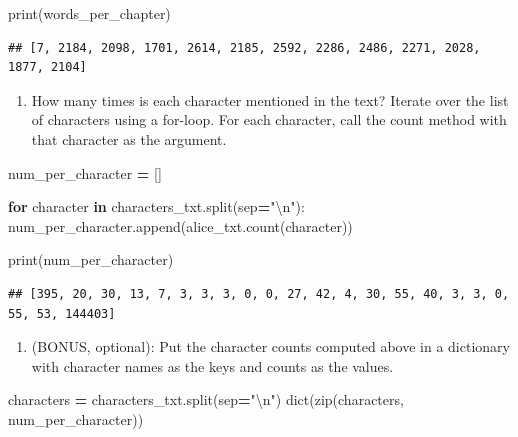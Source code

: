 \documentclass[
]{book}
\newenvironment{Shaded}{\begin{snugshade}}{\end{snugshade}}
\newcommand{\BuiltInTok}[1]{#1}
\newcommand{\CharTok}[1]{\textcolor[rgb]{0.31,0.60,0.02}{#1}}
\newcommand{\ControlFlowTok}[1]{\textcolor[rgb]{0.13,0.29,0.53}{\textbf{#1}}}
\newcommand{\KeywordTok}[1]{\textcolor[rgb]{0.13,0.29,0.53}{\textbf{#1}}}
\newcommand{\NormalTok}[1]{#1}
\newcommand{\OperatorTok}[1]{\textcolor[rgb]{0.81,0.36,0.00}{\textbf{#1}}}
\newcommand{\StringTok}[1]{\textcolor[rgb]{0.31,0.60,0.02}{#1}}
\providecommand{\tightlist}{%
  \setlength{\itemsep}{0pt}\setlength{\parskip}{0pt}}
\begin{document}
\begin{alert}
\begin{Shaded}
\begin{Highlighting}[]
\BuiltInTok{print}\NormalTok{(words\_per\_chapter)}
\end{Highlighting}
\end{Shaded}

\begin{verbatim}
## [7, 2184, 2098, 1701, 2614, 2185, 2592, 2286, 2486, 2271, 2028, 1877, 2104]
\end{verbatim}

\begin{enumerate}
\def\labelenumi{\arabic{enumi}.}
\setcounter{enumi}{2}
\tightlist
\item
  How many times is each character mentioned in the text?
  Iterate over the list of characters using a for-loop.
  For each character, call the count method with that character as the argument.
\end{enumerate}

\begin{Shaded}
\begin{Highlighting}[]
\NormalTok{num\_per\_character }\OperatorTok{=}\NormalTok{ []}

\ControlFlowTok{for}\NormalTok{ character }\KeywordTok{in}\NormalTok{ characters\_txt.split(sep}\OperatorTok{=}\StringTok{"}\CharTok{\textbackslash{}n}\StringTok{"}\NormalTok{):}
\NormalTok{    num\_per\_character.append(alice\_txt.count(character))}

\BuiltInTok{print}\NormalTok{(num\_per\_character)}
\end{Highlighting}
\end{Shaded}

\begin{verbatim}
## [395, 20, 30, 13, 7, 3, 3, 3, 0, 0, 27, 42, 4, 30, 55, 40, 3, 3, 0, 55, 53, 144403]
\end{verbatim}

\begin{enumerate}
\def\labelenumi{\arabic{enumi}.}
\setcounter{enumi}{3}
\tightlist
\item
  (BONUS, optional): Put the character counts computed above in a
  dictionary with character names as the keys and counts as the values.
\end{enumerate}

\begin{Shaded}
\begin{Highlighting}[]
\NormalTok{characters }\OperatorTok{=}\NormalTok{ characters\_txt.split(sep}\OperatorTok{=}\StringTok{"}\CharTok{\textbackslash{}n}\StringTok{"}\NormalTok{)}
\BuiltInTok{dict}\NormalTok{(}\BuiltInTok{zip}\NormalTok{(characters, num\_per\_character))}
\end{Highlighting}
\end{Shaded}


\end{alert}
\end{document}
